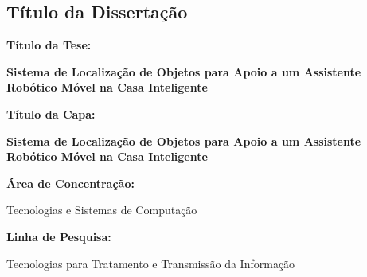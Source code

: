 \newpage

\begin{large}
\chapter*{Título da Dissertação}

\textbf{Título da Tese:}
\bigskip

\textbf{Sistema de Localização de Objetos para Apoio a um Assistente Robótico Móvel na Casa Inteligente}

\bigskip
\noindent\textbf{Título da Capa:}
\bigskip

\textbf{Sistema de Localização de Objetos para Apoio a um Assistente Robótico Móvel na Casa Inteligente}

\bigskip
\noindent\textbf{Área de Concentração:}
\bigskip

Tecnologias e Sistemas de Computação

\bigskip
\noindent\textbf{Linha de Pesquisa:}
\bigskip

Tecnologias para Tratamento e Transmissão da Informação
\end{large}

\tableofcontents

\pagebreak
